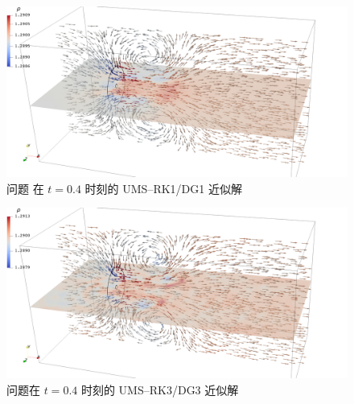\begin{figure}[h!]
\begin{centering}
\includegraphics[width=1\textwidth,height=0.26\textheight,keepaspectratio]{figures/upward/p=1/Frame40}
\par\end{centering}
\caption{\label{fig:upward_t=00003D4e-1_p=00003D1}问题
在 $t=0.4$ 时刻的 UMS–RK1/DG1 近似解}
\end{figure}

\begin{figure}[h!]
\begin{centering}
\includegraphics[width=1\textwidth,height=0.26\textheight,keepaspectratio]{figures/upward/p=3/Frame40}
\par\end{centering}
\caption{\label{fig:upward_t=00003D4e-1_p=00003D3}问题在
$t=0.4$ 时刻的 UMS–RK3/DG3 近似解}
\end{figure}

